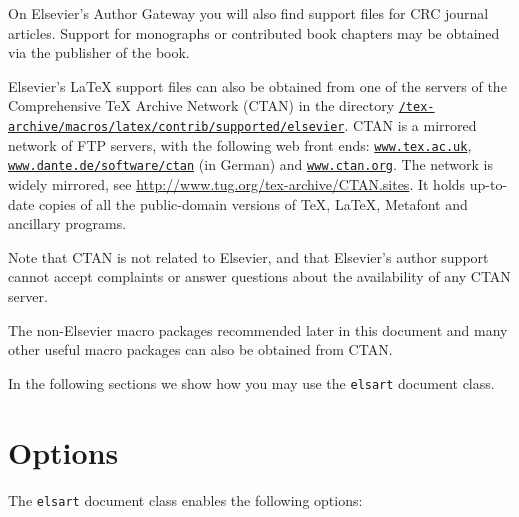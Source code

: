 \documentclass{elsart}
\def\file#1{\texttt{#1}}
\begin{document}
On Elsevier's Author Gateway you will also find support files for CRC
journal articles. Support for monographs or contributed book chapters
may be obtained via the publisher of the book.

Elsevier's \LaTeX{} support files can also be obtained from one of the
servers of the Comprehensive TeX Archive Network (CTAN) in the
directory\newline
\href{ftp://ctan.tug.org/tex-archive/macros/latex/contrib/supported/elsevier}%
{\texttt{/tex-archive/macros/latex/contrib/supported/elsevier}}. CTAN is a
mirrored network of FTP servers, with the following web front ends:
\href{http://www.tex.ac.uk}{\texttt{www.tex.ac.uk}},
\href{http://www.dante.de/software/ctan}{\texttt{www.dante.de/software/ctan}}
(in German) and \href{http://www.ctan.org}{\texttt{www.ctan.org}}. The
network is widely mirrored, see
\url{http://www.tug.org/tex-archive/CTAN.sites}. It holds up-to-date
copies of all the public-domain versions of \TeX, \LaTeX, Metafont and
ancillary programs.

Note that CTAN is not related to Elsevier, and that Elsevier's author
support cannot accept complaints or answer questions about the
availability of any CTAN server.

The non-Elsevier macro packages recommended later in this document and
many other useful macro packages can also be obtained from CTAN.

In the following sections we show how you may use the \file{elsart}
document class.

\section{Options}

The \file{elsart} document class enables the following options:
\end{document}
